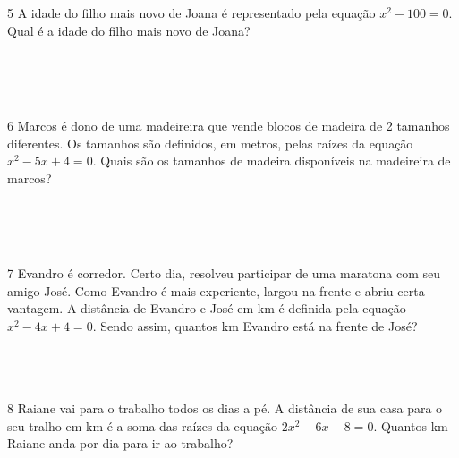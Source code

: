 \num{5} A idade do filho mais novo de Joana é representado pela equação $x^2 -
100 = 0$. Qual é a idade do filho mais novo de Joana?

\\
\\
\\

\pagebreak

\num{6} Marcos é dono de uma madeireira que vende blocos de madeira de 2
tamanhos diferentes. Os tamanhos são definidos, em metros, pelas raízes
da equação $x^2 - 5x + 4 = 0$. Quais são os tamanhos de madeira disponíveis
na madeireira de marcos?

\\
\\
\\

\num{7} Evandro é corredor. Certo dia, resolveu participar de uma maratona
com seu amigo José. Como Evandro é mais experiente, largou na frente e
abriu certa vantagem. A distância de Evandro e José em km é definida
pela equação $x^2 - 4x + 4 = 0$. Sendo assim, quantos km Evandro está na
frente de José?

\\
\\
\\

\num{8} Raiane vai para o trabalho todos os dias a pé. A distância de sua
casa para o seu tralho em km é a soma das raízes da equação $2x^2 − 6x − 8
= 0$. Quantos km Raiane anda por dia para ir ao trabalho?

\\
\\
\\
\\
\\

